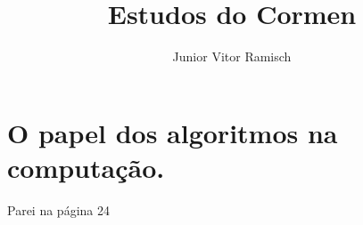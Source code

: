 \documentclass[a4paper, 11pt]{article}
\author{ Junior Vitor Ramisch }
\title{ Estudos do Cormen }
\begin{document}
    \maketitle

    \tableofcontents

    \section{ O papel dos algoritmos na computação. }

    \hspace{1cm} Parei na página 24
\end{document}
